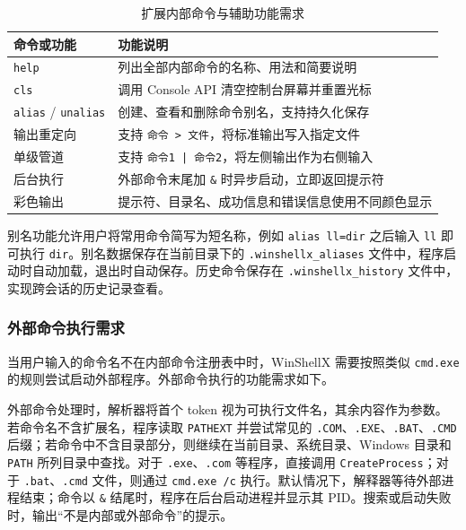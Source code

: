 \documentclass[UTF8,a4paper,12pt,fontset=none]{ctexart}
\begin{document}
\begingroup
    \renewcommand{\arraystretch}{1.3}
    \begin{table}[H]
        \centering
        \caption{扩展内部命令与辅助功能需求}\label{tab:extended_requirement}
        \begin{tabularx}{\textwidth}{>{\raggedright\arraybackslash}p{3.0cm} Y}
            \toprule
            命令或功能 & 功能说明 \\
            \midrule
            \texttt{help} & 列出全部内部命令的名称、用法和简要说明 \\
            \texttt{cls} & 调用 Console API 清空控制台屏幕并重置光标 \\
            \texttt{alias} / \texttt{unalias} & 创建、查看和删除命令别名，支持持久化保存 \\
            输出重定向 & 支持 \texttt{命令 > 文件}，将标准输出写入指定文件 \\
            单级管道 & 支持 \texttt{命令1 | 命令2}，将左侧输出作为右侧输入 \\
            后台执行 & 外部命令末尾加 \texttt{\&} 时异步启动，立即返回提示符 \\
            彩色输出 & 提示符、目录名、成功信息和错误信息使用不同颜色显示 \\
            \bottomrule
        \end{tabularx}
    \end{table}
\endgroup

别名功能允许用户将常用命令简写为短名称，例如 \texttt{alias ll=dir} 之后输入 \texttt{ll} 即可执行 \texttt{dir}。别名数据保存在当前目录下的 \texttt{.winshellx\_aliases} 文件中，程序启动时自动加载，退出时自动保存。历史命令保存在 \texttt{.winshellx\_history} 文件中，实现跨会话的历史记录查看。

\subsubsection{外部命令执行需求}

当用户输入的命令名不在内部命令注册表中时，WinShellX 需要按照类似 \texttt{cmd.exe} 的规则尝试启动外部程序。外部命令执行的功能需求如下。

外部命令处理时，解析器将首个 token 视为可执行文件名，其余内容作为参数。若命令名不含扩展名，程序读取 \texttt{PATHEXT} 并尝试常见的 \texttt{.COM}、\texttt{.EXE}、\texttt{.BAT}、\texttt{.CMD} 后缀；若命令中不含目录部分，则继续在当前目录、系统目录、Windows 目录和 \texttt{PATH} 所列目录中查找。对于 \texttt{.exe}、\texttt{.com} 等程序，直接调用 \texttt{CreateProcess}；对于 \texttt{.bat}、\texttt{.cmd} 文件，则通过 \texttt{cmd.exe /c} 执行。默认情况下，解释器等待外部进程结束；命令以 \texttt{\&} 结尾时，程序在后台启动进程并显示其 PID。搜索或启动失败时，输出“不是内部或外部命令”的提示。
\end{document}
